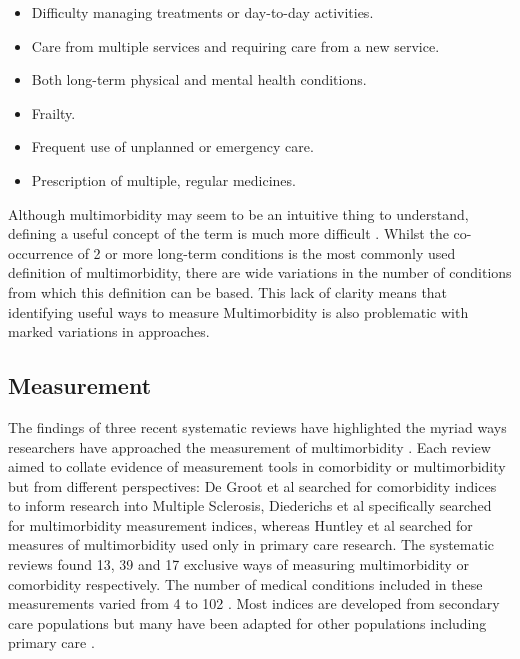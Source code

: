 \documentclass[12pt,]{report}
\providecommand{\tightlist}{%
  \setlength{\itemsep}{0pt}\setlength{\parskip}{0pt}}
\begin{document}
\begin{itemize}
\tightlist
\item
  Difficulty managing treatments or day-to-day activities.
\item
  Care from multiple services and requiring care from a new service.
\item
  Both long-term physical and mental health conditions.
\item
  Frailty.
\item
  Frequent use of unplanned or emergency care.
\item
  Prescription of multiple, regular medicines.
\end{itemize}

\citep{RN226}

Although multimorbidity may seem to be an intuitive thing to understand,
defining a useful concept of the term is much more difficult
\citep{RN155}. Whilst the co-occurrence of 2 or more long-term
conditions is the most commonly used definition of multimorbidity, there
are wide variations in the number of conditions from which this
definition can be based. This lack of clarity means that identifying
useful ways to measure Multimorbidity is also problematic with marked
variations in approaches.

\subsection{Measurement}\label{subsec:mm-measures}

The findings of three recent systematic reviews have highlighted the
myriad ways researchers have approached the measurement of
multimorbidity \citep{RN16, RN34, RN29}. Each review aimed to collate
evidence of measurement tools in comorbidity or multimorbidity but from
different perspectives: De Groot et al \citeyearpar{RN16} searched for
comorbidity indices to inform research into Multiple Sclerosis,
Diederichs et al \citeyearpar{RN34} specifically searched for
multimorbidity measurement indices, whereas Huntley et al
\citeyearpar{RN29} searched for measures of multimorbidity used only in
primary care research. The systematic reviews found 13, 39 and 17
exclusive ways of measuring multimorbidity or comorbidity respectively.
The number of medical conditions included in these measurements varied
from 4 to 102 \citeyearpar{RN34}. Most indices are developed from
secondary care populations but many have been adapted for other
populations including primary care \citep{RN34, RN29}.
\end{document}
